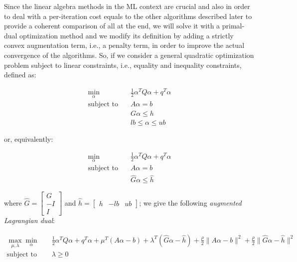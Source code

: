 \bigskip

Since the linear algebra methods in the ML context are crucial and also in order to deal with a per-iteration cost equals to the other algorithms described later to provide a coherent comparison of all at the end, we will solve it with a primal-dual optimization method and we modify its definition by adding a strictly convex augmentation term, i.e., a penalty term, in order to improve the actual convergence of the algorithms. So, if we consider a general quadratic optimization problem subject to linear constraints, i.e., equality and inequality constraints, defined as:

\begin{equation}
    \begin{aligned} 
        \min_{\alpha} \quad & \frac{1}{2} \alpha^T Q \alpha + q^T \alpha \\
            \textrm{subject to} \quad & A \alpha = b \\ & G \alpha \leq h \\ & lb \leq \alpha \leq ub
    \end{aligned}
\end{equation}

or, equivalently:

\begin{equation}
    \begin{aligned}
        \min_{\alpha} \quad & \frac{1}{2} \alpha^T Q \alpha + q^T \alpha \\
            \textrm{subject to} \quad & A \alpha = b \\ & \hat{G} \alpha \leq \hat{h}
    \end{aligned}
\end{equation}

where $\hat{G} =
\begin{bmatrix}
 G \\
-I \\
 I 
\end{bmatrix}$ and $\hat{h} =
\begin{bmatrix}
h & -lb & ub
\end{bmatrix}$; we give the following \emph{augmented Lagrangian dual}:

\begin{equation} \label{eq:l1_svr_gen_aug_lagrangian_dual}
	\begin{aligned}
		    \max_{\mu,\lambda} \min_{\alpha} \quad & \frac{1}{2} \alpha^T Q \alpha + q^T \alpha + \mu^T (A \alpha - b) + \lambda^T (\hat{G} \alpha - \hat{h}) + \frac{\rho}{2} \| A \alpha - b \|^2 + \frac{\rho}{2} \| \hat{G} \alpha - \hat{h} \|^2 \\
    \text{subject to} \quad & \lambda \geq 0
	\end{aligned}
\end{equation}

